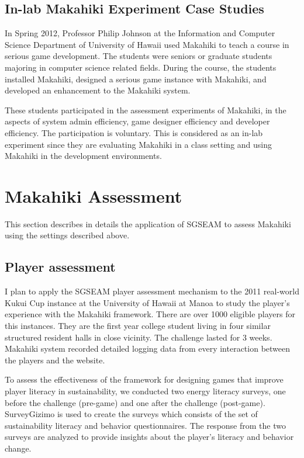 \subsection{In-lab Makahiki Experiment Case Studies}

In Spring 2012, Professor Philip Johnson at the Information and Computer Science Department of University of Hawaii used Makahiki to teach a course in serious game development. The students were seniors or graduate students majoring in computer science related fields. During the course, the students installed Makahiki, designed a serious game instance with Makahiki, and developed an enhancement to the Makahiki system.

These students participated in the assessment experiments of Makahiki, in the aspects of system admin efficiency, game designer efficiency and developer efficiency. The participation is voluntary. This is considered as an in-lab experiment since they are evaluating Makahiki in a class setting and using Makahiki in the development environments.

\section{Makahiki Assessment}
This section describes in details the application of SGSEAM to assess Makahiki using the settings described above.

\subsection{Player assessment}

I plan to apply the SGSEAM player assessment mechanism to the 2011 real-world Kukui Cup instance at the University of Hawaii at Manoa to study the player's experience with the Makahiki framework. There are over 1000 eligible players for this instances. They are the first year college student living in four similar structured resident halls in close vicinity. The challenge lasted for 3 weeks. Makahiki system recorded detailed logging data from every interaction between the players and the website.

To assess the effectiveness of the framework for designing games that improve player literacy in sustainability, we
conducted two energy literacy surveys, one before the challenge (pre-game) and one after
the challenge (post-game). SurveyGizimo is used to create the surveys which consists of the set of sustainability literacy and behavior questionnaires. The response from the two surveys are analyzed to provide insights about the player's literacy and behavior change.


